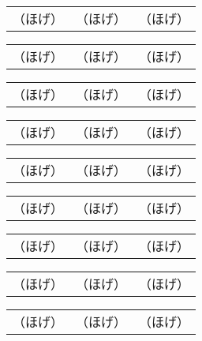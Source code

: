 \documentclass{tarticle}
\begin{document}
\begin{tabular}{|c|c|c|}
（ほげ）&（ほげ）&（ほげ）
\end{tabular}

\begin{tabular}{|l|l|l|}
（ほげ）&（ほげ）&（ほげ）
\end{tabular}

\begin{tabular}{|r|r|r|}
（ほげ）&（ほげ）&（ほげ）
\end{tabular}

\begin{tabular}{|c|c|c|}
（ほげ） & （ほげ） & （ほげ）
\end{tabular}

\begin{tabular}{|l|l|l|}
（ほげ） & （ほげ） & （ほげ）
\end{tabular}

\begin{tabular}{|r|r|r|}
（ほげ） & （ほげ） & （ほげ）
\end{tabular}


\begin{tabular}{|c|c|c|}
\mbox{（ほげ）}&\mbox{（ほげ）}&\mbox{（ほげ）}
\end{tabular}

\begin{tabular}{|l|l|l|}
\mbox{（ほげ）}&\mbox{（ほげ）}&\mbox{（ほげ）}
\end{tabular}

\begin{tabular}{|r|r|r|}
\mbox{（ほげ）}&\mbox{（ほげ）}&\mbox{（ほげ）}
\end{tabular}
\end{document}

